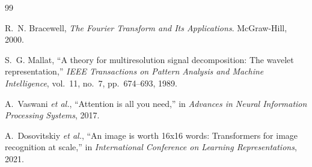 \documentclass[12pt,a4paper]{article}
\begin{document}
\begin{thebibliography}{99}

R.~N. Bracewell, \emph{The Fourier Transform and Its Applications}. McGraw-Hill, 2000.

S.~G. Mallat, ``A theory for multiresolution signal decomposition: The wavelet representation,'' \emph{IEEE Transactions on Pattern Analysis and Machine Intelligence}, vol.~11, no.~7, pp.~674--693, 1989.

A.~Vaswani \emph{et al.}, ``Attention is all you need,'' in \emph{Advances in Neural Information Processing Systems}, 2017.

A.~Dosovitskiy \emph{et al.}, ``An image is worth 16x16 words: Transformers for image recognition at scale,'' in \emph{International Conference on Learning Representations}, 2021.

\end{thebibliography}
\end{document}
